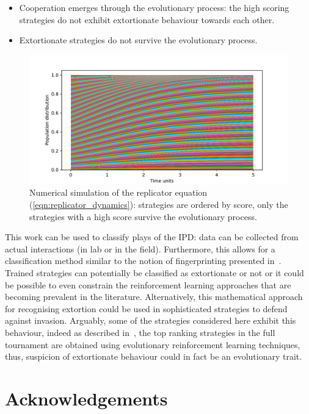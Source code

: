 \documentclass[a4paper]{article}
\begin{document}
\begin{itemize}
    \item Cooperation emerges through the evolutionary process: the high scoring
        strategies do not exhibit extortionate behaviour towards each other.
    \item Extortionate strategies do not survive the evolutionary process.
\end{itemize}

\begin{figure}[!htbp]
    \centering
    \includegraphics[width=.8\textwidth]{./assets/img/replicator_dynamics/main.pdf}
    \caption{Numerical simulation of the replicator equation
    (\ref{eqn:replicator_dynamics}): strategies are ordered by score, only the strategies with a high score survive the evolutionary process.}
    \label{fig:replicator_dynamics}
\end{figure}

This work can be used to classify plays of the IPD\@: data can be collected from
actual interactions (in lab or in the field). Furthermore, this allows for a
classification method similar to the notion of fingerprinting presented
in~\cite{Ashlock2008}. Trained strategies can potentially be classified as
extortionate or not or it could be possible to even constrain the reinforcement
learning approaches that are becoming prevalent in the literature.
Alternatively, this mathematical approach for recognising extortion could be
used in sophisticated strategies to defend against invasion. Arguably, some of
the strategies considered here exhibit this behaviour, indeed as described
in~\cite{Harper2017}, the top ranking strategies in the full tournament are
obtained using evolutionary reinforcement learning techniques, thus, suspicion
of extortionate behaviour could in fact be an evolutionary trait.

\section*{Acknowledgements}
\end{document}
